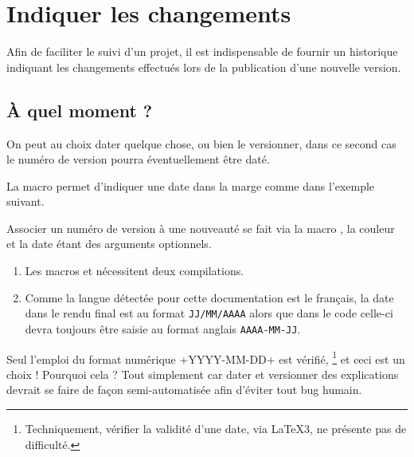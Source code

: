 \documentclass[10pt, a4paper]{../main/main}
\begin{document}
\section{Indiquer les changements}

Afin de faciliter le suivi d'un projet, il est indispensable de fournir un historique indiquant les changements effectués lors de la publication d'une nouvelle version.



\subsection{À quel moment ?}

On peut au choix dater quelque chose, ou bien le versionner, dans ce second cas le numéro de version pourra éventuellement être daté.


\begin{tdocexa}
    La macro  permet d'indiquer une date dans la marge comme dans l'exemple suivant.

\end{tdocexa}


\begin{tdocexa}
    Associer un numéro de version à une nouveauté se fait via la macro , la couleur et la date étant des arguments optionnels.

\end{tdocexa}


\begin{tdocimp}
    \begin{enumerate}
        \item Les macros  et  nécessitent deux compilations.

        \item Comme la langue détectée pour cette documentation est le français, la date dans le rendu final est au format \texttt{JJ/MM/AAAA} alors que dans le code celle-ci devra toujours être saisie au format anglais \texttt{AAAA-MM-JJ}.
    \end{enumerate}
\end{tdocimp}


\begin{tdocwarn}
    Seul l'emploi du format numérique \tdocinlatex+YYYY-MM-DD+ est vérifié,
    \footnote{
        Techniquement, vérifier la validité d'une date, via \LaTeX3, ne présente pas de difficulté.
    }
    et ceci est un choix ! Pourquoi cela ? Tout simplement car dater et versionner des explications devrait se faire de façon semi-automatisée afin d'éviter tout bug humain.
\end{tdocwarn}
\end{document}
